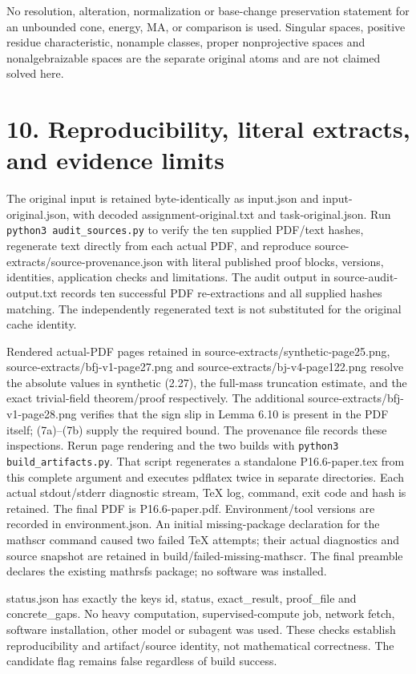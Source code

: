 \documentclass[11pt]{article}
\begin{document}
No resolution, alteration, normalization or base-change preservation statement for an unbounded cone, energy, MA, or comparison is used. Singular spaces, positive residue characteristic, nonample classes, proper nonprojective spaces and nonalgebraizable spaces are the separate original atoms and are not claimed solved here.

\section*{10. Reproducibility, literal extracts, and evidence limits}

The original input is retained byte-identically as input.json and input-original.json, with decoded assignment-original.txt and task-original.json. Run \texttt{python3 audit\_sources.py} to verify the ten supplied PDF/text hashes, regenerate text directly from each actual PDF, and reproduce source-extracts/source-provenance.json with literal published proof blocks, versions, identities, application checks and limitations. The audit output in source-audit-output.txt records ten successful PDF re-extractions and all supplied hashes matching. The independently regenerated text is not substituted for the original cache identity.

Rendered actual-PDF pages retained in source-extracts/synthetic-page25.png, source-extracts/bfj-v1-page27.png and source-extracts/bj-v4-page122.png resolve the absolute values in synthetic (2.27), the full-mass truncation estimate, and the exact trivial-field theorem/proof respectively. The additional source-extracts/bfj-v1-page28.png verifies that the sign slip in Lemma 6.10 is present in the PDF itself; (7a)--(7b) supply the required bound. The provenance file records these inspections. Rerun page rendering and the two builds with \texttt{python3 build\_artifacts.py}. That script regenerates a standalone P16.6-paper.tex from this complete argument and executes pdflatex twice in separate directories. Each actual stdout/stderr diagnostic stream, TeX log, command, exit code and hash is retained. The final PDF is P16.6-paper.pdf. Environment/tool versions are recorded in environment.json. An initial missing-package declaration for the mathscr command caused two failed TeX attempts; their actual diagnostics and source snapshot are retained in build/failed-missing-mathscr. The final preamble declares the existing mathrsfs package; no software was installed.

status.json has exactly the keys id, status, exact\_result, proof\_file and concrete\_gaps. No heavy computation, supervised-compute job, network fetch, software installation, other model or subagent was used. These checks establish reproducibility and artifact/source identity, not mathematical correctness. The candidate flag remains false regardless of build success.
\end{document}
